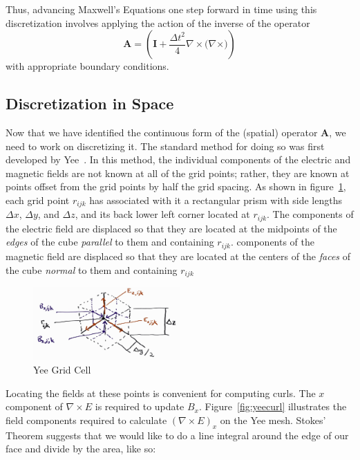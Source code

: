 \documentclass{article}
\newcommand{\curl}[1]{\nabla \times {#1}}
\newcommand{\dt}{\Delta t}
\newcommand{\iden}{\mathbf{I}}
\begin{document}
Thus, advancing Maxwell's Equations one step forward in time using
this discretization involves applying the action of the inverse of the
operator
\begin{equation}
\mathbf{A} = \left(\iden + \frac{\dt^2}{4} \curl{(\curl)} \right)
\label{eq:1}
\end{equation}
with appropriate boundary conditions.

\subsection{Discretization in Space}

Now that we have identified the continuous form of the (spatial) operator
$\mathbf{A}$, we need to work on discretizing it.
The standard method for doing so was first developed by
Yee~\cite{yee1966numerical}.
In this method, the individual components of the electric and magnetic
fields are not known at all of the grid points; rather, they are known
at points offset from the grid points by half the grid spacing.
As shown in figure~\ref{fig:yeecell}, each grid point $r_{ijk}$ has associated
with it a rectangular prism with side lengths $\Delta x$, $\Delta y$, and $\Delta
z$, and its back lower left corner located at $r_{ijk}$.
The components of the electric field are displaced so that they are located
at the midpoints of the {\em edges} of the cube {\em parallel} to them and
containing $r_{ijk}$.
components of the magnetic field are displaced so that they are
located at the centers of the {\em faces} of the cube {\em normal} to
them and containing $r_{ijk}$

\begin{figure}[htbp]
  \centering
  \includegraphics[width=0.5\textwidth]{YeeCellDiagram}
  \caption{Yee Grid Cell}
  \label{fig:yeecell}
\end{figure}

Locating the fields at these points is convenient for computing
curls.  The $x$ component of $\curl{E}$ is required to update $B_x$.
Figure~\ref{fig:yeecurl} illustrates the field components required to
calculate $(\curl{E})_x$ on the Yee mesh.  Stokes' Theorem suggests
that we would like to do a line integral around the edge of our face
and divide by the area, like so:
\end{document}
